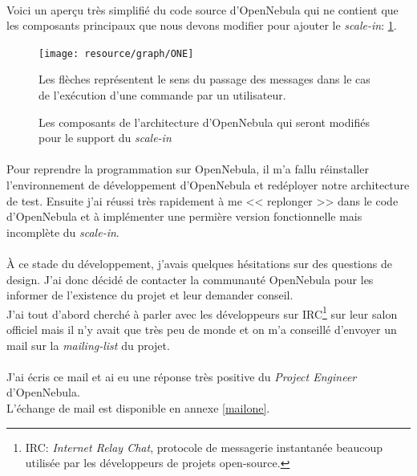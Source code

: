 \paragraph*{}
Voici un aperçu très simplifié du code source d'OpenNebula qui ne contient que les composants principaux que nous devons modifier pour ajouter le \emph{scale-in}: \ref{archionescalein}.

\begin{figure}[H]
\centering
\texttt{[image: resource/graph/ONE]}
\caption{Les composants de l'architecture d'OpenNebula qui seront modifiés pour le support du \emph{scale-in}\\}
Les flèches représentent le sens du passage des messages dans le cas de l'exécution d'une commande par un utilisateur.
\label{archionescalein}
\end{figure}


\paragraph*{}
Pour reprendre la programmation sur OpenNebula, il m'a fallu réinstaller l'environnement de développement d'OpenNebula et redéployer notre architecture de test.
Ensuite j'ai réussi très rapidement à me << replonger >> dans le code d'OpenNebula et à implémenter une permière version fonctionnelle mais incomplète du \emph{scale-in}.

\paragraph*{}
À ce stade du développement, j'avais quelques hésitations sur des questions de design. J'ai donc décidé de contacter la communauté OpenNebula pour les informer de l'existence
du projet et leur demander conseil.\\
J'ai tout d'abord cherché à parler avec les développeurs sur IRC\footnote{IRC: \emph{Internet Relay Chat}, protocole de messagerie instantanée beaucoup utilisée
par les développeurs de projets open-source.} sur leur salon officiel mais il n'y avait que très peu de monde et on m'a conseillé d'envoyer un mail sur la \emph{mailing-list} du
projet.

\paragraph*{}
J'ai écris ce mail et ai eu une réponse très positive du \emph{Project Engineer} d'OpenNebula.\\
L'échange de mail est disponible en annexe \ref{mailone}.




